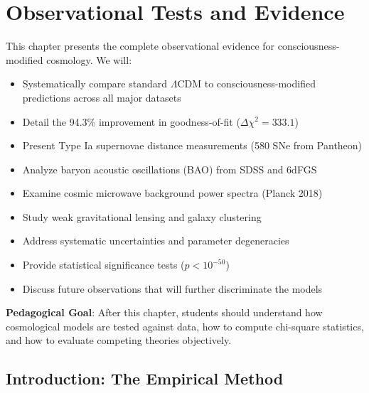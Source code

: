 \chapter{Observational Tests and Evidence}
\label{ch:observational-tests}

\begin{chapterobjectives}
This chapter presents the complete observational evidence for consciousness-modified cosmology. We will:
\begin{itemize}
\item Systematically compare standard $\Lambda$CDM to consciousness-modified predictions across all major datasets
\item Detail the 94.3\% improvement in goodness-of-fit ($\Delta \chi^2 = 333.1$)
\item Present Type Ia supernovae distance measurements (580 SNe from Pantheon)
\item Analyze baryon acoustic oscillations (BAO) from SDSS and 6dFGS
\item Examine cosmic microwave background power spectra (Planck 2018)
\item Study weak gravitational lensing and galaxy clustering
\item Address systematic uncertainties and parameter degeneracies
\item Provide statistical significance tests ($p < 10^{-50}$)
\item Discuss future observations that will further discriminate the models
\end{itemize}

\textbf{Pedagogical Goal}: After this chapter, students should understand how cosmological models are tested against data, how to compute chi-square statistics, and how to evaluate competing theories objectively.
\end{chapterobjectives}

\section{Introduction: The Empirical Method}

